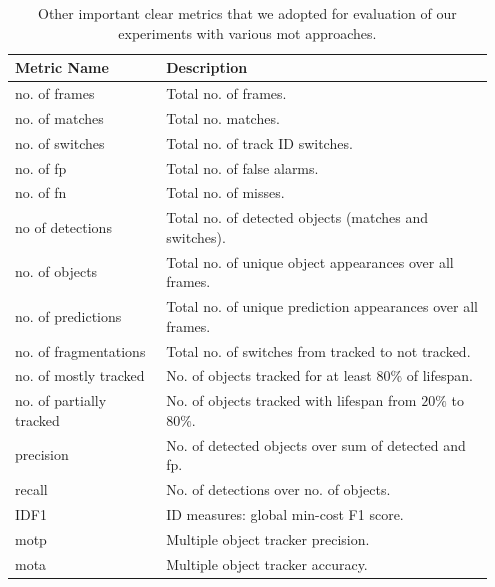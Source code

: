 \begin{table}[t]
    \centering
    \begin{tabular}{p{0.3\linewidth}p{0.65\linewidth}}
        \toprule
        \textbf{Metric Name}     & \textbf{Description}                                        \\
        \midrule
        no. of frames            & Total no. of frames.                                        \\
        no. of matches           & Total no. matches.                                          \\
        no. of switches          & Total no. of track ID switches.                             \\
        no. of \gls{fp}          & Total no. of false alarms.                                  \\
        no. of \gls{fn}          & Total no. of misses.                                        \\
        no of detections         & Total no. of detected objects (matches and switches).       \\
        no. of objects           & Total no. of unique object appearances over all frames.     \\
        no. of predictions       & Total no. of unique prediction appearances over all frames. \\
        no. of fragmentations    & Total no. of switches from tracked to not tracked.          \\
        no. of mostly tracked    & No. of objects tracked for at least $80\%$ of lifespan.     \\
        no. of partially tracked & No. of objects tracked with lifespan from $20\%$ to $80\%$. \\
        precision                & No. of detected objects over sum of detected and \gls{fp}.  \\
        recall                   & No. of detections over no. of objects.                      \\
        IDF1                     & ID measures: global min-cost F1 score.                      \\
        \gls{motp}               & Multiple object tracker precision.                          \\
        \gls{mota}               & Multiple object tracker accuracy.                           \\
        \bottomrule
    \end{tabular}
    \caption[Other \gls{mot} metrics]{Other important \gls{clear} metrics that we adopted for evaluation of our experiments with various \gls{mot} approaches.}
    \label{tab:OtherCLEARMetrics}
\end{table}
